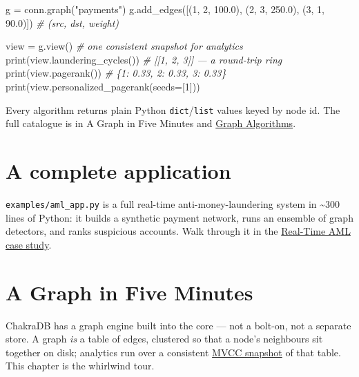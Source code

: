 \documentclass[
  11pt,
  openany]{book}
\newenvironment{Shaded}{}{}
\newcommand{\BuiltInTok}[1]{\textcolor[rgb]{0.00,0.50,0.00}{#1}}
\newcommand{\CommentTok}[1]{\textcolor[rgb]{0.38,0.63,0.69}{\textit{#1}}}
\newcommand{\DecValTok}[1]{\textcolor[rgb]{0.25,0.63,0.44}{#1}}
\newcommand{\FloatTok}[1]{\textcolor[rgb]{0.25,0.63,0.44}{#1}}
\newcommand{\NormalTok}[1]{#1}
\newcommand{\OperatorTok}[1]{\textcolor[rgb]{0.40,0.40,0.40}{#1}}
\newcommand{\StringTok}[1]{\textcolor[rgb]{0.25,0.44,0.63}{#1}}
\begin{document}
\begin{Shaded}
\begin{Highlighting}[]
\NormalTok{g }\OperatorTok{=}\NormalTok{ conn.graph(}\StringTok{"payments"}\NormalTok{)}
\NormalTok{g.add\_edges([(}\DecValTok{1}\NormalTok{, }\DecValTok{2}\NormalTok{, }\FloatTok{100.0}\NormalTok{), (}\DecValTok{2}\NormalTok{, }\DecValTok{3}\NormalTok{, }\FloatTok{250.0}\NormalTok{), (}\DecValTok{3}\NormalTok{, }\DecValTok{1}\NormalTok{, }\FloatTok{90.0}\NormalTok{)])   }\CommentTok{\# (src, dst, weight)}

\NormalTok{view }\OperatorTok{=}\NormalTok{ g.view()                        }\CommentTok{\# one consistent snapshot for analytics}
\BuiltInTok{print}\NormalTok{(view.laundering\_cycles())        }\CommentTok{\# [[1, 2, 3]] — a round{-}trip ring}
\BuiltInTok{print}\NormalTok{(view.pagerank())                 }\CommentTok{\# \{1: 0.33, 2: 0.33, 3: 0.33\}}
\BuiltInTok{print}\NormalTok{(view.personalized\_pagerank(seeds}\OperatorTok{=}\NormalTok{[}\DecValTok{1}\NormalTok{]))}
\end{Highlighting}
\end{Shaded}

Every algorithm returns plain Python \texttt{dict}/\texttt{list} values
keyed by node id. The full catalogue is in A Graph in Five Minutes and
\href{../graph/algorithms.md}{Graph Algorithms}.

\section{A complete application}\label{a-complete-application}

\texttt{examples/aml\_app.py} is a full real-time anti-money-laundering
system in \textasciitilde300 lines of Python: it builds a synthetic
payment network, runs an ensemble of graph detectors, and ranks
suspicious accounts. Walk through it in the
\href{../case-studies/aml.md}{Real-Time AML case study}.

\section{A Graph in Five Minutes}\label{a-graph-in-five-minutes}

ChakraDB has a graph engine built into the core --- not a bolt-on, not a
separate store. A graph \emph{is} a table of edges, clustered so that a
node's neighbours sit together on disk; analytics run over a consistent
\href{../engine/mvcc.md}{MVCC snapshot} of that table. This chapter is
the whirlwind tour.
\end{document}
